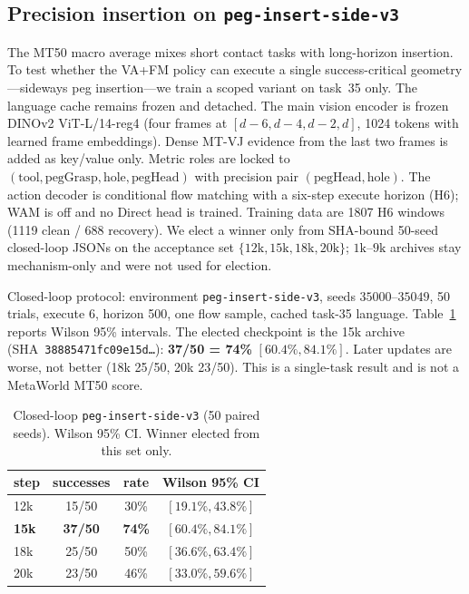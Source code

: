 \documentclass[10pt,twocolumn]{article}
\begin{document}
\subsection{Precision insertion on \texttt{peg-insert-side-v3}}
\label{sec:task35}
The MT50 macro average mixes short contact tasks with long-horizon insertion.
To test whether the VA+FM policy can execute a single success-critical
geometry---sideways peg insertion---we train a scoped variant on task~35
only. The language cache remains frozen and detached. The main vision
encoder is frozen DINOv2 ViT-L/14-reg4 (four frames at
$[d{-}6,d{-}4,d{-}2,d]$, 1024 tokens with learned frame embeddings). Dense
MT-VJ evidence from the last two frames is added as key/value only. Metric
roles are locked to $(\mathrm{tool},\mathrm{pegGrasp},\mathrm{hole},\mathrm{pegHead})$
with precision pair $(\mathrm{pegHead},\mathrm{hole})$. The action decoder is
conditional flow matching with a six-step execute horizon (H6); WAM is off
and no Direct head is trained. Training data are 1807 H6 windows (1119
clean / 688 recovery). We elect a winner only from SHA-bound 50-seed
closed-loop JSONs on the acceptance set $\{12\mathrm{k},15\mathrm{k},18\mathrm{k},20\mathrm{k}\}$;
$1\mathrm{k}$--$9\mathrm{k}$ archives stay mechanism-only and were not
used for election.

Closed-loop protocol: environment \texttt{peg-insert-side-v3}, seeds
$35000$--$35049$, 50 trials, execute 6, horizon 500, one flow sample,
cached task-35 language. Table~\ref{tab:task35-cl} reports Wilson 95\%
intervals. The elected checkpoint is the 15k archive
(SHA~\texttt{38885471fc09e15d\ldots}): \textbf{37/50 = 74\%}
$[60.4\%,84.1\%]$. Later updates are worse, not better
(18k 25/50, 20k 23/50). This is a single-task result and is not a MetaWorld
MT50 score.

\begin{table}[t]
\centering\small
\caption{Closed-loop \texttt{peg-insert-side-v3} (50 paired seeds).
Wilson 95\% CI. Winner elected from this set only.}
\label{tab:task35-cl}
\begin{tabular}{lccc}
\toprule
step & successes & rate & Wilson 95\% CI \\
\midrule
12k & 15/50 & 30\% & $[19.1\%,43.8\%]$ \\
\textbf{15k} & \textbf{37/50} & \textbf{74\%} & $\mathbf{[60.4\%,84.1\%]}$ \\
18k & 25/50 & 50\% & $[36.6\%,63.4\%]$ \\
20k & 23/50 & 46\% & $[33.0\%,59.6\%]$ \\
\bottomrule
\end{tabular}
\end{table}
\end{document}
